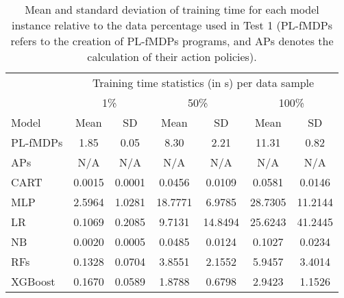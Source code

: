\begin{table}[htbp!]
\caption{Mean and standard deviation of training time for each model instance relative to the data percentage used in Test 1 (PL-fMDPs refers to the creation of PL-fMDPs programs, and APs denotes the calculation of their action policies).}
\label{tab:training_exp1}
\begin{tabular}{lcccccc}
\toprule
& \multicolumn{6}{c}{Training time statistics (in s) per data sample} \\
\cmidrule(lr){2-7}
& \multicolumn{2}{c}{1\%} & \multicolumn{2}{c}{50\%} & \multicolumn{2}{c}{100\%} \\
\cmidrule(lr){2-7}
Model & Mean & SD & Mean & SD & Mean & SD \\
\midrule
PL-fMDPs & 1.85 & 0.05 & 8.30 & 2.21 & 11.31 & 0.82 \\
APs & N/A & N/A & N/A & N/A & N/A & N/A \\
CART & 0.0015 & 0.0001 & 0.0456 & 0.0109 & 0.0581 & 0.0146 \\
MLP & 2.5964 & 1.0281 & 18.7771 & 6.9785 & 28.7305 & 11.2144 \\
LR & 0.1069 & 0.2085 & 9.7131 & 14.8494 & 25.6243 & 41.2445 \\
NB & 0.0020 & 0.0005 & 0.0485 & 0.0124 & 0.1027 & 0.0234 \\
RFs & 0.1328 & 0.0704 & 3.8551 & 2.1552 & 5.9457 & 3.4014 \\
XGBoost & 0.1670 & 0.0589 & 1.8788 & 0.6798 & 2.9423 & 1.1526 \\
\bottomrule
\end{tabular}
\end{table}